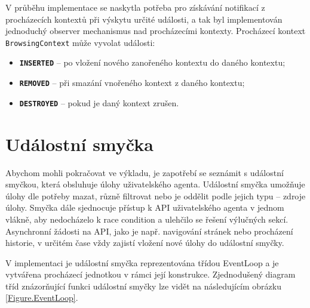 V průběhu implementace se naskytla potřeba pro získávání notifikací z procházecích kontextů při výskytu určité události, a tak byl implementován jednoduchý observer mechanismus nad procházecími kontexty. Procházecí kontext \texttt{BrowsingContext} může vyvolat události:

\begin{itemize}
  \item \textbf{\texttt{INSERTED}} -- po vložení nového zanořeného kontextu do daného kontextu;
  \item \textbf{\texttt{REMOVED}} -- při smazání vnořeného kontext z daného kontextu;
  \item \textbf{\texttt{DESTROYED}} -- pokud je daný kontext zrušen. 
\end{itemize}

\section{Událostní smyčka}
\label{Chapter.Implementation.EventLoop}

Abychom mohli pokračovat ve výkladu, je zapotřebí se seznámit s událostní smyčkou, která obsluhuje úlohy uživatelského agenta. Událostní smyčka umožňuje úlohy dle potřeby mazat, různě filtrovat nebo je oddělit podle jejich typu – zdroje úlohy. Smyčka dále sjednocuje přístup k API uživatelského agenta v jednom vlákně, aby nedocházelo k race condition a ulehčilo se řešení výlučných sekcí. Asynchronní žádosti na API, jako je např. navigování stránek nebo procházení historie, v určitém čase vždy zajistí vložení nové úlohy do událostní smyčky.

V implementaci je událostní smyčka reprezentována třídou EventLoop a je vytvářena procházecí jednotkou v rámci její konstrukce. Zjednodušený diagram tříd znázorňující funkci událostní smyčky lze vidět na následujícím obrázku \ref{Figure.EventLoop}. 


